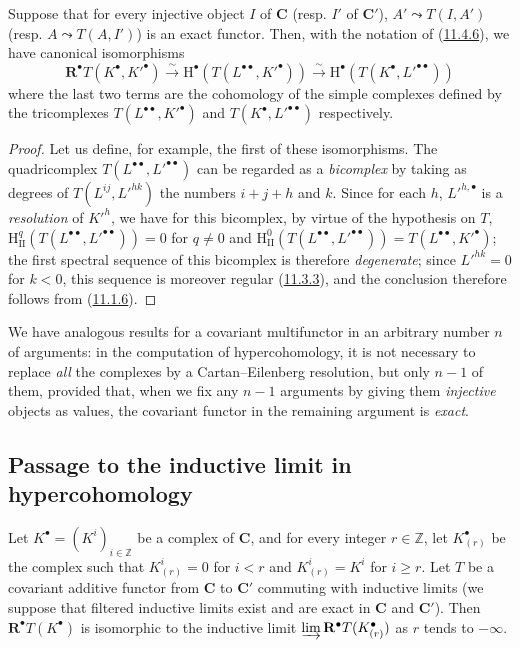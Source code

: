 \begin{proposition}[11.4.7]
\label{0.11.4.7}
Suppose that for every injective object $I$ of $\boldsymbol{C}$ \textup{(resp.} $I'$ of
$\boldsymbol{C}'$), $A'\leadsto T(I,A')$ \textup{(resp.} $A\leadsto T(A,I')$) is an
exact functor. Then, with the notation of
\textup{(\hyperref[0.11.4.6]{11.4.6})}, we have canonical isomorphisms
\[
  \label{0.11.4.7.1}
  \mathbf R^\bullet T(K^\bullet,K'^\bullet)
  \xrightarrow{\sim}\mathrm H^\bullet(T(L^{\bullet\bullet},K'^\bullet))
  \xrightarrow{\sim}\mathrm H^\bullet(T(K^\bullet,L'^{\bullet\bullet}))
  \tag{11.4.7.1}
\]
where the last two terms are the cohomology of the simple complexes defined
by the tricomplexes $T(L^{\bullet\bullet},K'^\bullet)$ and
$T(K^\bullet,L'^{\bullet\bullet})$ respectively.
\end{proposition}

\begin{proof}
Let us define, for example, the first of these isomorphisms. The quadricomplex
$T(L^{\bullet\bullet},L'^{\bullet\bullet})$ can be regarded as a
\emph{bicomplex} by taking as degrees of $T(L^{ij},L'^{hk})$ the numbers
$i+j+h$ and $k$. Since for each $h$, $L'^{h,\bullet}$ is a
\emph{resolution} of $K'^h$, we have for this bicomplex, by virtue of the hypothesis
on $T$,
$\mathrm H_{\mathrm{II}}^q(T(L^{\bullet\bullet},L'^{\bullet\bullet}))=0$
for $q\neq0$ and
$\mathrm H_{\mathrm{II}}^0(T(L^{\bullet\bullet},L'^{\bullet\bullet}))
=T(L^{\bullet\bullet},K'^\bullet)$; the first spectral sequence of this
bicomplex is therefore \emph{degenerate}; since $L'^{hk}=0$ for $k<0$, this
sequence is moreover regular (\hyperref[0.11.3.3]{11.3.3}), and the
conclusion therefore follows from (\hyperref[0.11.1.6]{11.1.6}).
\end{proof}

We have analogous results for a covariant multifunctor in an arbitrary
number $n$ of arguments: in the computation of hypercohomology, it is not
necessary to replace \emph{all} the complexes by a Cartan--Eilenberg
resolution, but only $n-1$ of them, provided that, when we fix any
$n-1$ arguments by giving them \emph{injective} objects as values,
the covariant functor in the remaining argument is
\emph{exact}.

\subsection{Passage to the inductive limit in hypercohomology}
\label{subsection:0.11.5}

\begin{lemma}[11.5.1]
\label{0.11.5.1}
Let $K^\bullet=(K^i)_{i\in\mathbb Z}$ be a complex of $\boldsymbol{C}$, and for
every integer $r\in\mathbb Z$, let $K_{(r)}^\bullet$ be the complex such that
$K_{(r)}^i=0$ for $i<r$ and $K_{(r)}^i=K^i$ for $i\geq r$. Let $T$ be a
covariant additive functor
from $\boldsymbol{C}$ to $\boldsymbol{C}'$ commuting with
inductive limits (we suppose that filtered inductive limits exist
and are exact in $\boldsymbol{C}$ and $\boldsymbol{C}'$). Then
$\mathbf R^\bullet T(K^\bullet)$ is isomorphic to the inductive limit $\varinjlim\mathbf R^\bullet T(K_{(r)}^\bullet)$
as $r$ tends to $-\infty$.
\end{lemma}

